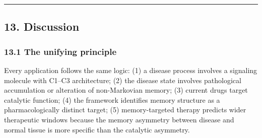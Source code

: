 \documentclass[
]{article}
\begin{document}
\begin{center}\rule{0.5\linewidth}{0.5pt}\end{center}

\hypertarget{discussion}{%
\subsection{13. Discussion}\label{discussion}}

\hypertarget{the-unifying-principle}{%
\subsubsection{13.1 The unifying
principle}\label{the-unifying-principle}}

Every application follows the same logic: (1) a disease process involves
a signaling molecule with C1--C3 architecture; (2) the disease state
involves pathological accumulation or alteration of non-Markovian
memory; (3) current drugs target catalytic function; (4) the framework
identifies memory structure as a pharmacologically distinct target; (5)
memory-targeted therapy predicts wider therapeutic windows because the
memory asymmetry between disease and normal tissue is more specific than
the catalytic asymmetry.
\end{document}
